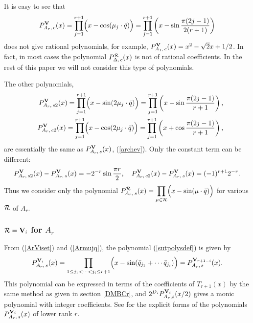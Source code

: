 \documentclass[a4paper,12pt]{article}
\newcommand{\vTm}{\vphantom{\mbox{\oneeight I}}}
\begin{document}
It is easy to see that
\[
   P_{A_r,\,c}^{\bf V}(x)
   =\prod_{j=1}^{r+1}\Bigl(x-\cos(\mu_j\cdot\bar{q})\Bigr)=
   \prod_{j=1}^{r+1}\left(\vTm x-\sin\frac{\pi(2j-1)}{2(r+1)}\right)
\]
does not give rational polynomials, for example,
$P_{A_1,\,c}^{\bf V}(x)=x^2-\sqrt{2}x+1/2$.
In fact, in most cases the polynomial $P_{\Delta,\,c}^{\cal R}(x)$ is
not of rational coefficients.
In the rest of this paper we will not consider this type of polynomials.

The other polynomials,
\begin{eqnarray*}
   &&P_{A_r,\,s2}^{\bf V}(x)
   =\prod_{j=1}^{r+1}\Bigl(x-\sin(2\mu_j\cdot\bar{q})\Bigr)
   =\prod_{j=1}^{r+1}\left(\vTm x-\sin\frac{\pi(2j-1)}{r+1}\right),\\
%
   &&P_{A_r,\,c2}^{\bf V}(x)
   =\prod_{j=1}^{r+1}\Bigl(x-\cos(2\mu_j\cdot\bar{q})\Bigr)
   =\prod_{j=1}^{r+1}\left(\vTm x+\cos\frac{\pi(2j-1)}{r+1}\right),
\end{eqnarray*}
are essentially the same as $P_{A_r,\,s}^{\bf V}(x)$, (\ref{archev}).
Only the constant term can be different:
\begin{equation}
   P_{A_r,\,s2}^{\bf V}(x)-P_{A_r,\,s}^{\bf V}(x)=-2^{-r}\sin\frac{\pi r}{2},
   \quad
   P_{A_r,\,c2}^{\bf V}(x)-P_{A_r,\,s}^{\bf V}(x)=(-1)^{r+1}2^{-r}.
\end{equation}
Thus we consider only the polynomial
$\displaystyle P_{A_r,\,s}^{\cal R}(x)=\prod_{\mu\in{\cal R}}
\Bigl(x-\sin(\mu\cdot\bar{q})\Bigr)$ for various ${\cal R}$ of $A_r$.

\subsubsection{${\cal R}={\bf V}_i$ for $A_r$}

{}From (\ref{ArViset}) and (\ref{Armujq}), the polynomial (\ref{sutpolysdef})
is given by
\begin{equation}
   P_{A_r,\,s}^{{\bf V}_i}(x)=\prod_{1\leq j_1<\cdots<j_i\leq r+1}
   \Bigl(x-\sin(\bar{q}_{j_1}+\cdots\bar{q}_{j_i})\Bigr)
   =P_{A_r,\,s}^{{\bf V}_{r+1-i}}(x).
   \label{ArVis}
\end{equation}
This polynomial can be expressed in terms of the coefficients of $T_{r+1}(x)$
by the same method as given in section \ref{DMBCr}, and 
$2^{D_i}P_{A_r,s}^{{\bf V}_i}(x/2)$ gives a monic polynomial with 
integer coefficients.
See \cite{poly} for the explicit forms of the polynomials 
$P_{A_r,\,s}^{{\bf V}_i}(x)$ of lower rank $r$.
\end{document}
